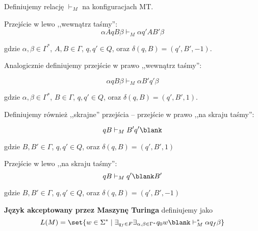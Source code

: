 \begin{definition}
    Definiujemy relację \( \vdash_M \) na konfiguracjach MT.
    
    Przejście w lewo ,,wewnątrz taśmy'':
    \[
        \alpha A q B \beta 
        \vdash_M
        \alpha q' A B' \beta
    \]
    
    gdzie \(\alpha, \beta \in \Gamma^*\), \(A, B \in \Gamma\), \(q, q'\in Q\), oraz \(\delta(q, B) = (q', B', -1)\).
    
    Analogicznie definiujemy przejście w prawo ,,wewnątrz taśmy'':

       \[
        \alpha q B \beta 
        \vdash_M
        \alpha B' q' \beta
    \]
    
    gdzie \(\alpha, \beta \in \Gamma^*\), \(B \in \Gamma\), \(q, q'\in Q\), oraz \(   \delta(q, B) = (q', B', 1) \).
    
    Definiujemy również ,,skrajne'' przejścia -- przejście w prawo ,,na skraju taśmy'':
    
    \[ 
        q B 
        \vdash_M
        B' q' \blank 
    \]
    
    gdzie \(B, B' \in \Gamma\), \(q, q' \in Q\), oraz \( \delta(q, B) = (q', B', 1) \)

    Przejście w lewo ,,na skraju taśmy'':
    \[
         q B 
        \vdash_M
        q' \blank B' 
    \]
    
    gdzie \(B, B' \in \Gamma\), \(q, q' \in Q\), oraz \( \delta(q, B) = (q', B', -1)\)

    
\end{definition}


\begin{definition}
    \textbf{Język akceptowany przez Maszynę Turinga} definiujemy jako
    \[
        L(M) = \set{w \in \Sigma^* \mid \exists_{q_f \in F} \exists_{\alpha, \beta \in \Gamma^*} q_0w\blank \vdash_M^* \alpha q_f \beta}
    \]
\end{definition}

